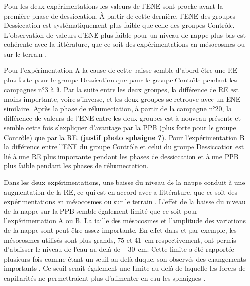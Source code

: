 \subsubsection{\coo}

Pour les deux expérimentations les valeurs de l'ENE sont proche avant la première phase de dessiccation.
À partir de cette dernière, l'ENE des groupes Dessiccation est systématiquement plus faible que celle des groupes Contrôle.
L'observation de valeurs d'ENE plus faible pour un niveau de nappe plus bas est cohérente avec la littérature, que ce soit des expérimentations en mésocosmes \citet{aerts1997,blodau2004} ou sur le terrain \citet{bubier2003,sonnentag2010}.

Pour l'expérimentation A la cause de cette baisse semble d'abord être une RE plus forte pour le groupe Dessication que pour le groupe Contrôle pendant les campagnes n°3 à 9.
Par la suite entre les deux groupes, la différence de RE est moins importante, voire s'inverse, et les deux groupes se retrouve avec un ENE similaire.
Après la phase de réhumectation, à partir de la campagne n°20, la différence de valeurs de l'ENE entre les deux groupes est à nouveau présente et semble cette fois s'expliquer d'avantage par la PPB (plus forte pour le groupe Contrôle) que par la RE. (\textbf{justif photo sphaigne ?}).
Pour l'expérimentation B la différence entre l'ENE du groupe Contrôle et celui du groupe Dessiccation est lié à une RE plus importante pendant les phases de dessiccation et à une PPB plus faible pendant les phases de réhumectation.

Dans les deux expérimentations, une baisse du niveau de la nappe conduit à une augmentation de la RE, ce qui est en accord avec a littérature, que ce soit des expérimentations en mésocosmes \citet{blodau2004,dinsmore2009} ou sur le terrain \citet{ballantyne2014}. 
L'effet de la baisse du niveau de la nappe sur la PPB semble également limité que ce soit pour l'expérimentation A ou B.
La taille des mésocosmes et l'amplitude des variations de la nappe sont peut être assez importante.
En effet dans \citet{blodau2004} et \citet{dinsmore2009} par exemple, les mésocosmes utilisés sont plus grands, 75 et \SI{41}{\centi\metre} respectivement, ont permis d'abaisser le niveau de l'eau au delà de \SI{-30}{\centi\metre}.
Cette limite a été rapportée plusieurs fois comme étant un seuil au delà duquel son observés des changements importants \citep{blodau2004,peichl2014}.
Ce seuil serait également une limite au delà de laquelle les forces de capillarités ne permettraient plus d'alimenter en eau les sphaignes \citep{rydin2013a,ketcheson2014}.

